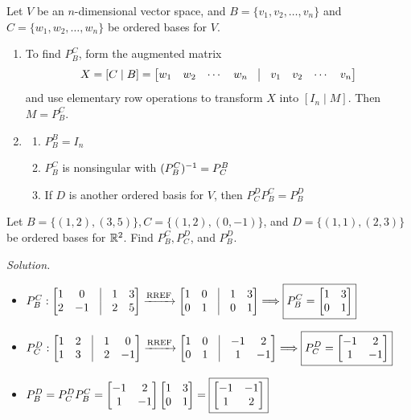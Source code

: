 \begin{remark}
Let $V$ be an $n$-dimensional vector space, and $B = \{v_1, v_2, \dots, v_n\}$ and $C = \{w_1, w_2, \dots, w_n\}$ be ordered bases for $V$.
\begin{enumerate}
    \item To find $P_B^C$, form the augmented matrix
    $$X = [C \mid B] = \bmat{w_1 & w_2 & \cdots & w_n & \vline & v_1 & v_2 & \cdots & v_n}$$
    and use elementary row operations to transform $X$ into $[I_n \mid M]$. Then $M = P_B^C$.
    \item 
    \begin{enumerate}
        \item $P_B^B = I_n$ 
        \item $P_B^C$ is nonsingular with $(P_B^C)^{-1} = P_C^B$
        \item If $D$ is another ordered basis for $V$, then $P_C^D P_B^C = P_B^D$
    \end{enumerate}
\end{enumerate}
\end{remark}

\begin{example}
Let $B = \{(1, 2), (3, 5)\}, C = \{(1, 2), (0, -1)\}$, and $D = \{(1, 1), (2, 3)\}$ be ordered bases for $\mathbb{R}^2$. Find $P_B^C, P_C^D$, and $P_B^D$.

\textit{Solution.}

\begin{itemize}
    \item $P_B^C: \bmat{1 & 0 & \vline & 1 & 3 \\ 2 & -1 & \vline & 2 & 5} 
    \xrightarrow{\text{RREF}} 
    \bmat{1 & 0 & \vline & 1 & 3 \\ 0 & 1 & \vline & 0 & 1} 
    \Longrightarrow \boxed{P_B^C = \bmat{1 & 3 \\ 0 & 1}}$
    \item $P_C^D: \bmat{1 & 2 & \vline & 1 & 0 \\ 1 & 3 & \vline & 2 & -1}
    \xrightarrow{\text{RREF}}
    \bmat{1 & 0 & \vline &-1 & 2 \\ 0 & 1 & \vline & 1 & -1}
    \Longrightarrow \boxed{P_C^D = \bmat{-1 & 2 \\ 1 & -1}}
    $
    \item $P_B^D = P_C^D P_B^C = \begin{bmatrix} -1 & 2 \\ 1 & -1 \end{bmatrix}\begin{bmatrix} 1 & 3 \\ 0 & 1 \end{bmatrix}
    =\boxed{\begin{bmatrix} -1 & -1 \\ 1 & 2 \end{bmatrix}}$
\end{itemize}
\end{example}

